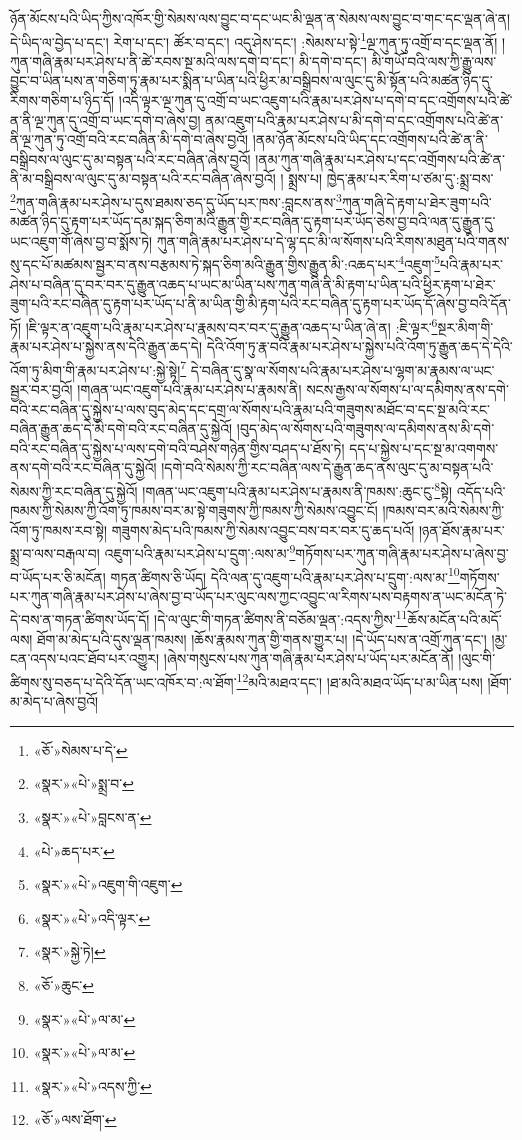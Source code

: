 ཉོན་མོངས་པའི་ཡིད་ཀྱིས་འཁོར་གྱི་སེམས་ལས་བྱུང་བ་དང་ཡང་མི་ལྡན་ན་སེམས་ལས་བྱུང་བ་གང་དང་ལྡན་ཞེ་ན། དེ་ཡིད་ལ་བྱེད་པ་དང་། རེག་པ་དང་། ཚོར་བ་དང་། འདུ་ཤེས་དང་། :སེམས་པ་སྟེ་\footnote{«ཅོ་»སེམས་པ་དེ་}ལྔ་ཀུན་ཏུ་འགྲོ་བ་དང་ལྡན་ནོ། །ཀུན་གཞི་རྣམ་པར་ཤེས་པ་ནི་ཚེ་རབས་སྔ་མའི་ལས་དགེ་བ་དང་། མི་དགེ་བ་དང་། མི་གཡོ་བའི་ལས་ཀྱི་རྒྱུ་ལས་བྱུང་བ་ཡིན་པས་ན་གཅིག་ཏུ་རྣམ་པར་སྨིན་པ་ཡིན་པའི་ཕྱིར་མ་བསྒྲིབས་ལ་ལུང་དུ་མི་སྟོན་པའི་མཚན་ཉིད་དུ་རིགས་གཅིག་པ་ཉིད་དོ། །འདི་ལྟར་ལྔ་ཀུན་དུ་འགྲོ་བ་ཡང་འཇུག་པའི་རྣམ་པར་ཤེས་པ་དགེ་བ་དང་འགྲོགས་པའི་ཚེ་ན་ནི་ལྔ་ཀུན་དུ་འགྲོ་བ་ཡང་དགེ་བ་ཞེས་བྱ། ནམ་འཇུག་པའི་རྣམ་པར་ཤེས་པ་མི་དགེ་བ་དང་འགྲོགས་པའི་ཚེ་ན་ནི་ལྔ་ཀུན་ཏུ་འགྲོ་བའི་རང་བཞིན་མི་དགེ་བ་ཞེས་བྱའོ། །ནམ་ཉོན་མོངས་པའི་ཡིད་དང་འགྲོགས་པའི་ཚེ་ན་ནི་བསྒྲིབས་ལ་ལུང་དུ་མ་བསྟན་པའི་རང་བཞིན་ཞེས་བྱའོ། །ནམ་ཀུན་གཞི་རྣམ་པར་ཤེས་པ་དང་འགྲོགས་པའི་ཚེ་ན་ནི་མ་བསྒྲིབས་ལ་ལུང་དུ་མ་བསྟན་པའི་རང་བཞིན་ཞེས་བྱའོ། །
སྨྲས་པ། ཁྱེད་རྣམ་པར་རིག་པ་ཙམ་དུ་:སྨྲ་བས་\footnote{«སྣར་»«པེ་»སྨྲ་བ་}ཀུན་གཞི་རྣམ་པར་ཤེས་པ་དུས་ཐམས་ཅད་དུ་ཡོད་པར་ཁས་:བླངས་ནས་\footnote{«སྣར་»«པེ་»བླངས་ན་}ཀུན་གཞི་དེ་རྟག་པ་ཐེར་ཟུག་པའི་མཚན་ཉིད་དུ་རྟག་པར་ཡོད་དམ་སྐད་ཅིག་མའི་རྒྱུན་གྱི་རང་བཞིན་དུ་རྟག་པར་ཡོད་ཅེས་བྱ་བའི་ལན་དུ་རྒྱུན་དུ་ཡང་འཇུག་གོ་ཞེས་བྱ་བ་སྨོས་ཏེ། ཀུན་གཞི་རྣམ་པར་ཤེས་པ་དེ་ལྷ་དང་མི་ལ་སོགས་པའི་རིགས་མཐུན་པའི་གནས་སུ་དང་པོ་མཚམས་སྦྱར་བ་ནས་བརྩམས་ཏེ་སྐད་ཅིག་མའི་རྒྱུན་གྱིས་རྒྱུན་མི་:འཆད་པར་\footnote{«པེ་»ཆད་པར་}འཇུག་\footnote{«སྣར་»«པེ་»འཇུག་གི་འཇུག་}པའི་རྣམ་པར་ཤེས་པ་བཞིན་དུ་བར་བར་དུ་རྒྱུན་འཆད་པ་ཡང་མ་ཡིན་པས་ཀུན་གཞི་ནི་མི་རྟག་པ་ཡིན་པའི་ཕྱིར་རྟག་པ་ཐེར་ཟུག་པའི་རང་བཞིན་དུ་རྟག་པར་ཡོད་པ་ནི་མ་ཡིན་གྱི་མི་རྟག་པའི་རང་བཞིན་དུ་རྟག་པར་ཡོད་དོ་ཞེས་བྱ་བའི་དོན་ཏོ། །ཇི་ལྟར་ན་འཇུག་པའི་རྣམ་པར་ཤེས་པ་རྣམས་བར་བར་དུ་རྒྱུན་འཆད་པ་ཡིན་ཞེ་ན། :ཇི་ལྟར་\footnote{«སྣར་»«པེ་»འདི་ལྟར་}སྔར་མིག་གི་རྣམ་པར་ཤེས་པ་སྐྱེས་ནས་དེའི་རྒྱུན་ཆད་དེ། དེའི་འོག་ཏུ་རྣ་བའི་རྣམ་པར་ཤེས་པ་སྐྱེས་པའི་འོག་ཏུ་རྒྱུན་ཆད་དེ་དེའི་འོག་ཏུ་མིག་གི་རྣམ་པར་ཤེས་པ་:སྐྱེ་སྟེ།\footnote{«སྣར་»སྐྱེ་ཏེ།} དེ་བཞིན་དུ་སྣ་ལ་སོགས་པའི་རྣམ་པར་ཤེས་པ་ལྷག་མ་རྣམས་ལ་ཡང་སྦྱར་བར་བྱའོ། །གཞན་ཡང་འཇུག་པའི་རྣམ་པར་ཤེས་པ་རྣམས་ནི། སངས་རྒྱས་ལ་སོགས་པ་ལ་དམིགས་ནས་དགེ་བའི་རང་བཞིན་དུ་སྐྱེས་པ་ལས་བུད་མེད་དང་དགྲ་ལ་སོགས་པའི་རྣམ་པའི་གཟུགས་མཐོང་བ་དང་སྔ་མའི་རང་བཞིན་རྒྱུན་ཆད་དེ་མི་དགེ་བའི་རང་བཞིན་དུ་སྐྱེའོ། །བུད་མེད་ལ་སོགས་པའི་གཟུགས་ལ་དམིགས་ནས་མི་དགེ་བའི་རང་བཞིན་དུ་སྐྱེས་པ་ལས་དགེ་བའི་བཤེས་གཉེན་གྱིས་བཤད་པ་ཐོས་ཏེ། དད་པ་སྐྱེས་པ་དང་སྔ་མ་འགགས་ནས་དགེ་བའི་རང་བཞིན་དུ་སྐྱེའོ། །དགེ་བའི་སེམས་ཀྱི་རང་བཞིན་ལས་དེ་རྒྱུན་ཆད་ནས་ལུང་དུ་མ་བསྟན་པའི་སེམས་ཀྱི་རང་བཞིན་དུ་སྐྱེའོ། །གཞན་ཡང་འཇུག་པའི་རྣམ་པར་ཤེས་པ་རྣམས་ནི་ཁམས་:ཆུང་ངུ་\footnote{«ཅོ་»ཆུང་}སྟེ། འདོད་པའི་ཁམས་ཀྱི་སེམས་ཀྱི་འོག་ཏུ་ཁམས་བར་མ་སྟེ་གཟུགས་ཀྱི་ཁམས་ཀྱི་སེམས་འབྱུང་ངོ། །ཁམས་བར་མའི་སེམས་ཀྱི་འོག་ཏུ་ཁམས་རབ་སྟེ། གཟུགས་མེད་པའི་ཁམས་ཀྱི་སེམས་འབྱུང་བས་བར་བར་དུ་ཆད་པའོ། །ཉན་ཐོས་རྣམ་པར་སྨྲ་བ་ལས་བརྒལ་བ། འཇུག་པའི་རྣམ་པར་ཤེས་པ་དྲུག་:ལས་མ་\footnote{«སྣར་»«པེ་»ལ་མ་}གཏོགས་པར་ཀུན་གཞི་རྣམ་པར་ཤེས་པ་ཞེས་བྱ་བ་ཡོད་པར་ཅི་མངོན། གཏན་ཚིགས་ཅི་ཡོད། དེའི་ལན་དུ་འཇུག་པའི་རྣམ་པར་ཤེས་པ་དྲུག་:ལས་མ་\footnote{«སྣར་»«པེ་»ལ་མ་}གཏོགས་པར་ཀུན་གཞི་རྣམ་པར་ཤེས་པ་ཞེས་བྱ་བ་ཡོད་པར་ལུང་ལས་ཀྱང་འབྱུང་ལ་རིགས་པས་བརྟགས་ན་ཡང་མངོན་ཏེ་དེ་བས་ན་གཏན་ཚིགས་ཡོད་དོ། །དེ་ལ་ལུང་གི་གཏན་ཚིགས་ནི་བཅོམ་ལྡན་:འདས་ཀྱིས་\footnote{«སྣར་»«པེ་»འདས་ཀྱི་}ཆོས་མངོན་པའི་མདོ་ལས། ཐོག་མ་མེད་པའི་དུས་ལྡན་ཁམས། །ཆོས་རྣམས་ཀུན་གྱི་གནས་གྱུར་པ། །དེ་ཡོད་པས་ན་འགྲོ་ཀུན་དང་། །མྱ་ངན་འདས་པའང་ཐོབ་པར་འགྱུར། །ཞེས་གསུངས་པས་ཀུན་གཞི་རྣམ་པར་ཤེས་པ་ཡོད་པར་མངོན་ནོ། །ལུང་གི་ཚིགས་སུ་བཅད་པ་དེའི་དོན་ཡང་འཁོར་བ་:ལ་ཐོག་\footnote{«ཅོ་»ལས་ཐོག་}མའི་མཐའ་དང་། །ཐ་མའི་མཐའ་ཡོད་པ་མ་ཡིན་པས། །ཐོག་མ་མེད་པ་ཞེས་བྱའོ། 